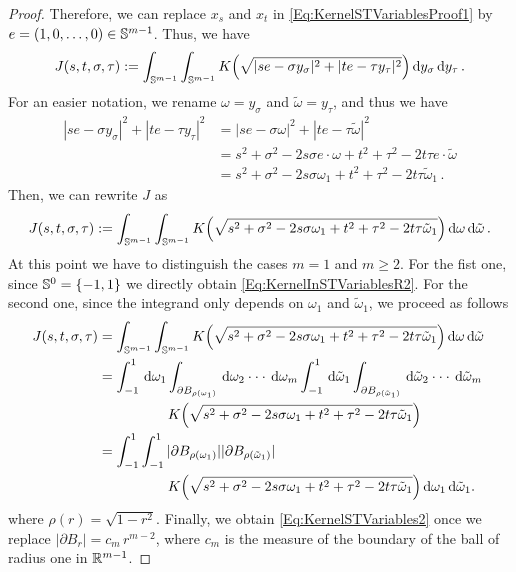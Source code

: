 \begin{proof}
Therefore, we can replace $x_s$ and $x_t$ in \eqref{Eq:KernelSTVariablesProof1} by $e =(1,0,\ldots,
0) \in \mathbb{S}^{m-1}$. Thus, we have
\begin{equation*}
J(s,t,\sigma, \tau) := \int_{\mathbb{S}^{m-1}}  \int_{\mathbb{S}^{m-1}} K\Big( \sqrt{|s e - \sigma y_\sigma|^2 + |t e - \tau y_\tau|^2 }\Big) \,\mathrm{d} y_\sigma \,\mathrm{d} y_\tau \,.
\end{equation*}
For an easier notation, we rename $\omega = y_\sigma$ and $\tilde\omega = y_\tau$, and thus we have
\begin{align*}
|s e - \sigma y_\sigma|^2 + |t e - \tau y_\tau|^2 &= |s e - \sigma \omega|^2 + |t e - \tau \tilde\omega|^2\\
&= s^2 +\sigma^2 - 2 s \sigma e \cdot \omega + t^2 + \tau^2 - 2 t \tau e\cdot \tilde\omega \\
&= s^2 +\sigma^2 - 2 s \sigma \omega_1 + t^2 + \tau^2 - 2t \tau\tilde\omega_1\,.
\end{align*}
Then, we can rewrite $J$ as
\begin{equation*}
\label{Eq:KernelSTVariablesProof3}
J(s,t,\sigma, \tau) := \int_{\mathbb{S}^{m-1}}  \int_{\mathbb{S}^{m-1}} K\Big( \sqrt{s^2+\sigma^2- 2 s \sigma \omega_1 + t^2 + \tau^2 - 2t \tau\tilde\omega_1}\Big) \,\mathrm{d} \omega \,\mathrm{d} \tilde\omega \,.
\end{equation*}
At this point we have to distinguish the cases $m=1$ and $m\geq 2$. For the fist one, since
$\mathbb{S}^{0} = \{-1,1\}$ we directly obtain \eqref{Eq:KernelInSTVariablesR2}. For the second one,
since the integrand only depends on $\omega_1$ and $\tilde\omega_1$, we proceed as follows
\begin{align*}
\label{Eq:KernelSTVariablesProof4}
J(s,t,\sigma, \tau) &= \int_{\mathbb{S}^{m-1}}  \int_{\mathbb{S}^{m-1}} K\Big( \sqrt{s^2+\sigma^2- 2 s \sigma \omega_1 + t^2 + \tau^2 - 2t \tau\tilde\omega_1}\Big) \,\mathrm{d} \omega \,\mathrm{d} \tilde\omega \,\\
&= \int_{-1}^1 \,\mathrm{d} \omega_1 \int_{\partial B_{\rho(\omega_1)}} \,\mathrm{d} \omega_2\cdot\cdot\cdot\,\mathrm{d} \omega_m \int_{-1}^1 \,\mathrm{d} \tilde\omega_1 \int_{\partial B_{\rho(\tilde\omega_1)}} \,\mathrm{d} \tilde\omega_2\cdot\cdot\cdot\,\mathrm{d} \tilde\omega_m  \\
& \quad \quad \quad \quad \quad K\Big( \sqrt{s^2+\sigma^2- 2 s \sigma \omega_1 + t^2 + \tau^2 - 2t \tau\tilde\omega_1}\Big) \, \\
&= \int_{-1}^1 \int_{-1}^1  |\partial B_{\rho(\omega_1)}| |\partial B_{\rho(\tilde\omega_1)}|\,\\
& \quad \quad \quad \quad \quad K\Big( \sqrt{s^2+\sigma^2- 2 s \sigma \omega_1 + t^2 + \tau^2 - 2t \tau\tilde\omega_1}\Big) \,\mathrm{d} \omega_1 \,\mathrm{d} \tilde\omega_1.
\end{align*}
where $\rho(r) = \sqrt{1-r^2}$. Finally, we obtain \eqref{Eq:KernelSTVariables2} once we replace
$|\partial B_{r}|=c_m\,r^{m-2}$, where $c_m$ is the measure of the boundary of the ball of radius one in
$\mathbb{R}^{m-1}$.
\end{proof}

